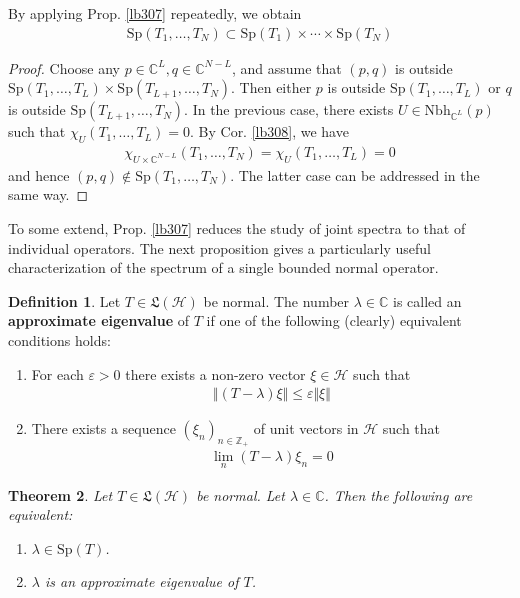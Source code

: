 \documentclass[12pt,b5paper,notitlepage]{article}
\theoremstyle{definition}
\newtheorem{df}{Definition}[subsection]
\theoremstyle{plain}
\newtheorem{thm}[df]{Theorem}
\newcommand{\fk}{\mathfrak}
\newcommand{\Cbb}{\mathbb C}
\newcommand{\Zbb}{\mathbb Z}
\newcommand{\Sp}{\mathrm{Sp}}
\newcommand{\Nbh}{\mathrm{Nbh}}
\newcommand{\eps}{\varepsilon}
\newcommand{\MH}{\mathcal H}
\numberwithin{equation}{section}
\begin{document}
By applying Prop. \ref{lb307} repeatedly, we obtain
\begin{align*}
\Sp(T_1,\dots,T_N)\subset\Sp(T_1)\times\cdots\times\Sp(T_N)
\end{align*}


\begin{proof}
Choose any $p\in\Cbb^L,q\in\Cbb^{N-L}$, and assume that $(p,q)$ is outside $\Sp(T_1,\dots,T_L)\times\Sp(T_{L+1},\dots,T_N)$. Then either $p$ is outside $\Sp(T_1,\dots,T_L)$ or $q$ is outside $\Sp(T_{L+1},\dots,T_N)$. In the previous case, there exists $U\in\Nbh_{\Cbb^L}(p)$ such that $\chi_U(T_1,\dots,T_L)=0$. By Cor. \ref{lb308}, we have
\begin{align*}
\chi_{U\times\Cbb^{N-L}}(T_1,\dots,T_N)=\chi_U(T_1,\dots,T_L)=0
\end{align*}
and hence $(p,q)\notin\Sp(T_1,\dots,T_N)$. The latter case can be addressed in the same way.
\end{proof}



To some extend, Prop. \ref{lb307} reduces the study of joint spectra to that of individual operators. The next proposition gives a particularly useful characterization of the spectrum of a single bounded normal operator.

\begin{df}
Let $T\in\fk L(\MH)$ be normal. The number $\lambda\in\Cbb$ is called an \textbf{approximate eigenvalue}  of $T$ if one of the following (clearly) equivalent conditions holds:
\begin{enumerate}
\item[(1)] For each $\eps>0$ there exists a non-zero vector $\xi\in\MH$ such that
\begin{align*}
\Vert (T-\lambda)\xi\Vert\leq\eps\Vert\xi\Vert
\end{align*}
\item[(2)] There exists a sequence $(\xi_n)_{n\in\Zbb_+}$ of unit vectors in $\MH$ such that
\begin{align*}
\lim_n (T-\lambda)\xi_n=0
\end{align*}
\end{enumerate}
\end{df}


\begin{thm}\label{lb312}
Let $T\in\fk L(\MH)$ be normal. Let $\lambda\in\Cbb$. Then the following are equivalent:
\begin{enumerate}
\item[(1)] $\lambda\in\Sp(T)$.
\item[(2)] $\lambda$ is an approximate eigenvalue of $T$.
\end{enumerate}
\end{thm}
\end{document}
